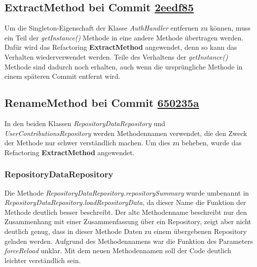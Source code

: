 \subsection{ExtractMethod bei Commit \href{https://github.com/lukaspanni/OpenSourceStats/commit/2eedf85be90e2566aa3811f9ccd3bac860c444a2} {2eedf85}}
\label{sec:ExtractMethod_AuthHandler}

Um die Singleton-Eigenschaft der Klasse \textit{AuthHandler} entfernen zu können, muss ein Teil der \textit{getInstance()} Methode in eine andere Methode übertragen werden.
Dafür wird das Refactoring \textbf{ExtractMethod} angewendet, denn so kann das Verhalten wiederverwendet werden.
Teile des Verhaltens der \textit{getInstance()} Methode sind dadurch noch erhalten, auch wenn die ursprüngliche Methode in einem späteren Commit entfernt wird.


\subsection{RenameMethod bei Commit \href{https://github.com/lukaspanni/OpenSourceStats/commit/650235a5868f35cd0c641f0112b921ddead17a17} {650235a}}
\label{sec:RenameMethod_Repositories}

In den beiden Klassen \textit{RepositoryDataRepository} und \textit{UserContributionsRepository} werden Methodennamen verwendet, die den Zweck der Methode nur schwer verständlich machen.
Um dies zu beheben, wurde das Refactoring \textbf{ExtractMethod} angewendet.

\subsubsection*{RepositoryDataRepository}
Die Methode \textit{RepositoryDataRepository.repositorySummary} wurde umbenannt in \textit{RepositoryDataRepository.loadRepositoryData}, da dieser Name die Funktion der Methode deutlich besser beschreibt. Der alte Methodenname beschreibt nur den Zusammenhang mit einer Zusammenfassung über ein Repository, zeigt aber nicht deutlich genug, dass in dieser Methode Daten zu einem übergebenen Repository geladen werden.
Aufgrund des Methodennamens war die Funktion des Parameters \textit{forceReload} unklar.
Mit dem neuen Methodennamen soll der Code deutlich leichter verständlich sein.
